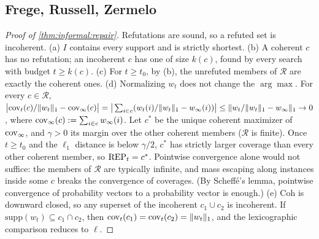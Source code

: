 \subsection{Frege, Russell, Zermelo}\label{app:informal:frz}

\begin{proof}[Proof of \cref{thm:informal:repair}]
Refutations are sound, so a refuted set is incoherent.
(a) $I$ contains every support and is strictly shortest.
(b) A coherent $c$ has no refutation; an incoherent $c$ has one of size $k(c)$, found by every search with budget $t\ge k(c)$.
(c) For $t\ge t_0$, by (b), the unrefuted members of $\mathcal R$ are exactly the coherent ones.
(d) Normalizing $w_t$ does not change the $\arg\max$. For every $c\in\mathcal R$, $\big|\mathrm{cov}_t(c)/\|w_t\|_1-\mathrm{cov}_\infty(c)\big|=\big|\sum_{i\in c}(w_t(i)/\|w_t\|_1-w_\infty(i))\big|\le\|w_t/\|w_t\|_1-w_\infty\|_1\to0$, where $\mathrm{cov}_\infty(c):=\sum_{i\in c}w_\infty(i)$. Let $c^*$ be the unique coherent maximizer of $\mathrm{cov}_\infty$, and $\gamma>0$ its margin over the other coherent members ($\mathcal R$ is finite). Once $t\ge t_0$ and the $\ell_1$ distance is below $\gamma/2$, $c^*$ has strictly larger coverage than every other coherent member, so $\mathrm{REP}_t=c^*$. Pointwise convergence alone would not suffice: the members of $\mathcal R$ are typically infinite, and mass escaping along instances inside some $c$ breaks the convergence of coverages. (By Scheffé's lemma, pointwise convergence of probability vectors to a probability vector is enough.)
(e) $\mathrm{Coh}$ is downward closed, so any superset of the incoherent $c_1\cup c_2$ is incoherent. If $\mathrm{supp}(w_t)\subseteq c_1\cap c_2$, then $\mathrm{cov}_t(c_1)=\mathrm{cov}_t(c_2)=\|w_t\|_1$, and the lexicographic comparison reduces to $\ell$.
\end{proof}

